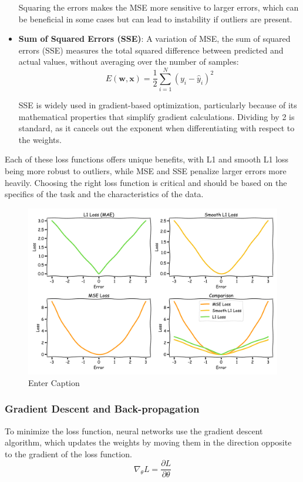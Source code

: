 \begin{itemize}
    Squaring the errors makes the MSE more sensitive to larger errors, which can be beneficial in some cases but can lead to instability if outliers are present.

    \item \textbf{Sum of Squared Errors (SSE)}:  
    A variation of MSE, the sum of squared errors (SSE) measures the total squared difference between predicted and actual values, without averaging over the number of samples:
    \begin{equation}
        E(\mathbf{w}, \mathbf{x}) = \frac{1}{2} \sum_{i=1}^{N} (y_i - \hat{y}_i)^2
    \end{equation}
    
    SSE is widely used in gradient-based optimization, particularly because of its mathematical properties that simplify gradient calculations. Dividing by 2 is standard, as it cancels out the exponent when differentiating with respect to the weights.
\end{itemize}

Each of these loss functions offers unique benefits, with L1 and smooth L1 loss being more robust to outliers, while MSE and SSE penalize larger errors more heavily. Choosing the right loss function is critical and should be based on the specifics of the task and the characteristics of the data.

\begin{figure}[H]
    \centering
    \includegraphics[width=1\linewidth]{LateX/figs/loss_functions_xkcd.pdf}
    \caption{Enter Caption}
    \label{fig:enter-label}
\end{figure}

\subsubsection*{Gradient Descent and Back-propagation}
To minimize the loss function, neural networks use the gradient descent algorithm, which updates the weights by moving them in the direction opposite to the gradient of the loss function. 
\begin{equation}
    \nabla_\theta L = \frac{\partial L}{\partial \theta}
\end{equation}

